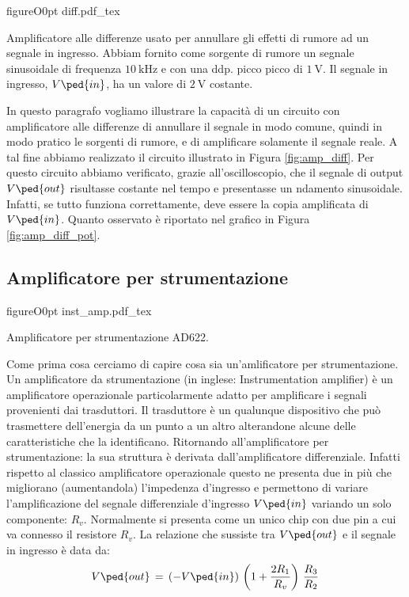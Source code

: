 \begin{wrapfloat}{figure}{O}{0pt}
        \def\svgwidth{0.5\textwidth}
        {diff.pdf_tex}
        \caption{Amplificatore alle differenze usato per annullare gli effetti di rumore ad un segnale in ingresso. Abbiam fornito come sorgente di rumore un segnale sinusoidale di frequenza $\SI{10}{\kilo\hertz}$ e con una ddp. picco picco di $\SI{1}{\volt}$. Il segnale in ingresso, $V\ped{in}$, ha un valore di $\SI{2}{\volt}$ costante.}
        \label{fig:amp_diff}
\end{wrapfloat}

In questo paragrafo vogliamo illustrare la capacità di un circuito con amplificatore alle differenze di annullare il segnale in modo comune, quindi in modo pratico le sorgenti di rumore, e di amplificare solamente il segnale reale.
A tal fine abbiamo realizzato il circuito illustrato in Figura \ref{fig:amp_diff}. Per questo circuito abbiamo verificato, grazie all'oscilloscopio, che il segnale di output $V\ped{out}$ risultasse costante nel tempo e presentasse un ndamento sinusoidale. Infatti, se tutto funziona correttamente, deve essere la copia amplificata di $V\ped{in}$.
Quanto osservato è riportato nel grafico in Figura \ref{fig:amp_diff_pot}.

\subsection*{Amplificatore per strumentazione}

\begin{wrapfloat}{figure}{O}{0pt}
        \def\svgwidth{0.5\textwidth}
        {inst_amp.pdf_tex}
        \caption{Amplificatore per strumentazione AD622.}
        \label{fig:inst_amp}
\end{wrapfloat}

Come prima cosa cerciamo di capire cosa sia un'amlificatore per strumentazione.
Un amplificatore da strumentazione (in inglese: Instrumentation amplifier) è un amplificatore operazionale particolarmente adatto per amplificare i segnali provenienti dai trasduttori. Il trasduttore è un qualunque dispositivo che può trasmettere dell'energia da un punto a un altro alterandone alcune delle caratteristiche che la identificano.
Ritornando all'amplificatore per strumentazione: la sua struttura è derivata dall'amplificatore differenziale. Infatti rispetto al classico amplificatore operazionale questo ne presenta due in più che migliorano (aumentandola) l'impedenza d'ingresso e permettono di variare l'amplificazione del segnale differenziale d'ingresso $V\ped{in}$  variando un solo componente: $R_v$. Normalmente si presenta come un unico chip con due pin a cui va connesso il resistore $R_v$.
La relazione che sussiste tra $V\ped{out}$ e il segnale in ingresso è data da:
\begin{equation}
        V\ped{out}\,=\,(-V\ped{in})\,\left(1 + \frac{2R_1}{R_v}\right)\,\frac{R_3}{R_2}
\end{equation}


